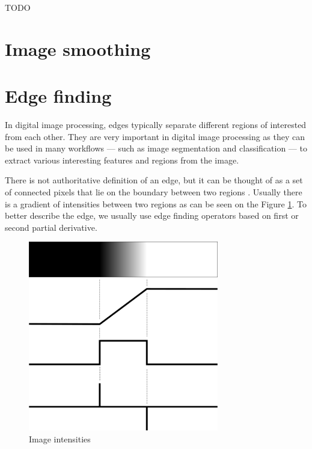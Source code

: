 \documentclass[
  digital,     %
  oneside,     %
  nosansbold,  %
  nocolorbold, %
  lof,         %
  lot,         %
]{fithesis4}
\begin{document}
TODO

\section{Image smoothing}

\section{Edge finding}

In digital image processing, edges typically separate different regions of
interested from each other. They are very important in digital image processing
as they can be used in many workflows --- such as image segmentation and
classification --- to extract various interesting features and regions
from the image.

There is not authoritative definition of an edge, but it can be thought of as a
set of connected pixels that lie on the boundary between two regions
\parencite{gonzalez2002}. Usually there is a gradient of intensities between two
regions as can be seen on the Figure \ref{fig:edge_intensities}. To better
describe the edge, we usually use edge finding operators based on first or second
partial derivative.

\begin{figure}
    \begin{center}
        \includegraphics[width=8.3cm]{resources/inkscape/gradient.png}
    \end{center}
    \caption{Image intensities} %
    \label{fig:edge_intensities}
\end{figure}



\end{document}
